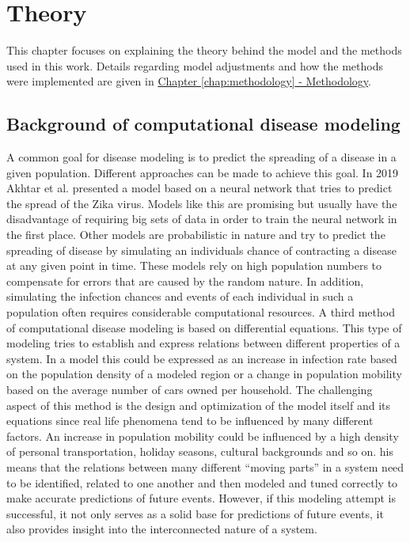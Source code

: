 
\chapter{Theory} %
This chapter focuses on explaining the theory behind the model and the methods used in this work.
Details regarding model adjustments and how the methods were implemented are given in
\hyperref[chap:methodology]{Chapter \ref*{chap:methodology} - Methodology}.

\label{chap:theory} %


\section{Background of computational disease modeling}
A common goal for disease modeling is to predict the spreading of a disease in a given population. Different approaches can be made to
achieve this goal. In 2019 Akhtar et al. presented a model based on a neural network that tries to predict the spread of the Zika virus\cite{akhatar2019dynamic}.
Models like this are promising but usually have the disadvantage of requiring big sets of data in order to train the neural network in the first place.
Other models are probabilistic in nature and try to predict the spreading of disease by simulating an individuals chance of contracting a
disease at any given point in time\cite{nakamura2017efficient,nakamura2020improved}. These models rely on high population numbers to compensate for errors that are caused by the random nature.
In addition, simulating the infection chances and events of each individual in such a population often requires considerable computational resources\cite{nakamura2017efficient}.
A third method of computational disease modeling is based on differential equations. This type of modeling tries to establish and express relations between different
properties of a system. In a model this could be expressed as an increase in infection rate based on the population density of a modeled region or a
change in population mobility based on the average number of cars owned per household. The challenging aspect of this method is the design and
optimization of the model itself and its equations since real life phenomena tend to be influenced by many
different factors. An increase in population mobility could be influenced by a high density of personal transportation, holiday seasons, cultural backgrounds and so on. 
his means that the relations between many
different ``moving parts'' in a system need to be identified, related to one another and then modeled and tuned correctly to make accurate predictions
of future events. However, if this modeling attempt is successful, it not only serves as a solid base for predictions of future events, it also provides insight
into the interconnected nature of a system.


